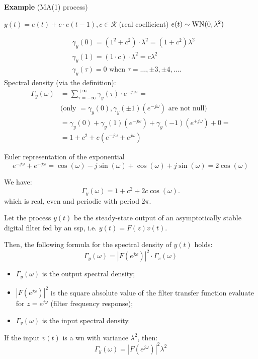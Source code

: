 \textbf{Example} (MA(1) process)

$y(t)=e(t)+c \cdot e(t-1), c \in \mathcal{R}$ (real coefficient)
$e(t)\sim \operatorname{WN}(0,\lambda^{2} )$

\begin{align*}
	&\gamma_{y}(0)=\left(1^{2}+c^{2}\right) \cdot \lambda^{2}=(1+c^{2})\lambda^{2}\\
	&\gamma_{y}(1)=(1 \cdot c) \cdot \lambda^{2}=c\lambda^{2} \\
	&\gamma_{y}(\tau)=0 \text { when } \tau=\ldots, \pm 3, \pm 4, \ldots .
\end{align*}
Spectral density (via the definition):
\begin{align*}
	\Gamma_{y}(\omega)&=\sum_{\tau=-\infty}^{+\infty} \gamma_{y}(\tau) \cdot e^{-j \omega \tau}= \\
	&\text{(only $=\gamma_{y}(0), \gamma_{y}(\pm 1)\left(e^{-j \omega}\right)$ are not null)} \\
	&=\gamma_{y}(0)+\gamma_{y}(1)\left(e^{-j \omega}\right)+\gamma_{y}(-1)\left(e^{+j \omega}\right)+0= \\
	&=1+c^{2}+c\left(e^{-j \omega}+e^{j \omega}\right)
\end{align*}

Euler representation of the exponential
$$
e^{-j \omega}+e^{+j \omega}=\cos (\omega)-j \sin (\omega)+\cos (\omega)+j \sin (\omega)=2 \cos (\omega)
$$

We have:
$$\Gamma_y(\omega)=1+c^{2}+2 c \cos (\omega).$$
which is real, even and periodic with period $2 \pi$.

Let the process $y(t)$ be the steady-state output of an asymptotically stable digital filter fed by an \gls{ssp}, i.e. $y(t)=F(z) v(t)$.

Then, the following formula for the spectral density of $y(t)$ holds:
$$\Gamma_{y}(\omega)=|F\left(e^{j \omega}\right)|^{2} \cdot \Gamma_{v}(\omega)$$

\begin{itemize}
	\item $\Gamma_{y}(\omega)$ is the output spectral density;
	\item $\left|F\left(e^{j \omega}\right)\right|^{2}$ is the square absolute value of the filter transfer function evaluate for $z=e^{j \omega}$ (filter frequency response);
	\item $\Gamma_{v}(\omega)$ is the input spectral density.
\end{itemize}

If the input $v(t)$ is a \gls{wn} with variance $\lambda^{2}$, then:
$$
\Gamma_{y}(\omega)=\left|F\left(e^{j \omega}\right)\right|^{2} \lambda^{2}
$$

